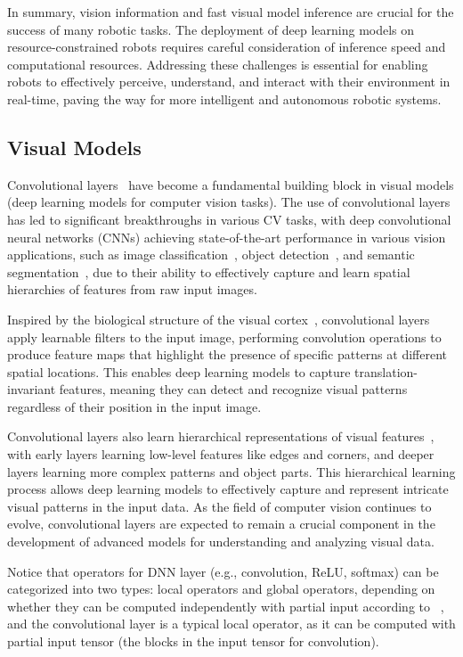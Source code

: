In summary, vision information and fast visual model inference are crucial for the success of many robotic tasks. 
The deployment of deep learning models on resource-constrained robots requires careful consideration of inference speed and computational resources. 
Addressing these challenges is essential for enabling robots to effectively perceive, understand, and interact with their environment in real-time, paving the way for more intelligent and autonomous robotic systems.

\subsection{Visual Models}
Convolutional layers~\cite{o2015introduction} have become a fundamental building block in visual models (deep learning models for computer vision tasks). 
The use of convolutional layers has led to significant breakthroughs in various CV tasks, with deep convolutional neural networks (CNNs) achieving state-of-the-art performance in various vision applications, such as image classification~\cite{rawat2017deep}, object detection~\cite{galvez2018object}, and semantic segmentation~\cite{wang2018understanding}, due to their ability to effectively capture and learn spatial hierarchies of features from raw input images.

Inspired by the biological structure of the visual cortex~\cite{tripp2019approximating}, convolutional layers apply learnable filters to the input image, performing convolution operations to produce feature maps that highlight the presence of specific patterns at different spatial locations. 
This enables deep learning models to capture translation-invariant features, meaning they can detect and recognize visual patterns regardless of their position in the input image.

Convolutional layers also learn hierarchical representations of visual features~\cite{ma2015hierarchical}, with early layers learning low-level features like edges and corners, and deeper layers learning more complex patterns and object parts. 
This hierarchical learning process allows deep learning models to effectively capture and represent intricate visual patterns in the input data.
As the field of computer vision continues to evolve, convolutional layers are expected to remain a crucial component in the development of advanced models for understanding and analyzing visual data.

Notice that operators for DNN layer (e.g., convolution, ReLU, softmax) can be categorized into two types: local operators and global operators, depending on whether they can be computed independently with partial input according to ~\cite{sun2024hybridparallel}, and the convolutional layer is a typical local operator, as it can be computed with partial input tensor (the blocks in the input tensor for convolution).

